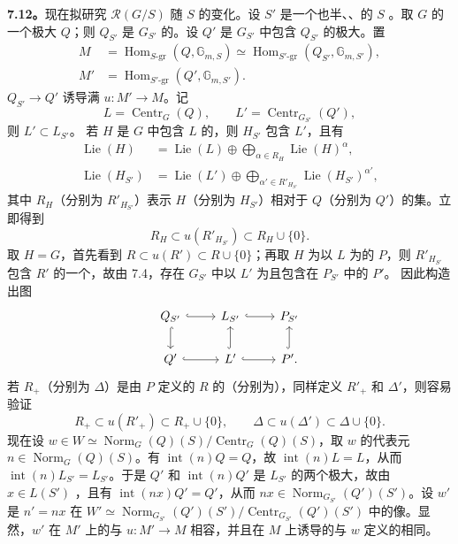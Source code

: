\textbf{7.12。}现在拟研究 $\mathscr R(G/S)$ 随 $S$ 的变化。设 $S'$ 是一个也半、、的 $S$ 。取 $G$ 的一个极大 $Q$；则 $Q_{S'}$ 是 $G_{S'}$ 的。设 $Q'$ 是 $G_{S'}$ 中包含 $Q_{S'}$ 的极大。置
\begin{align*}
 M&=\operatorname{Hom}_{S\text{-gr}}(Q,\mathbb G_{m,S})\simeq\operatorname{Hom}_{S'\text{-gr}}(Q_{S'},\mathbb G_{m,S'}),\\
 M'&=\operatorname{Hom}_{S'\text{-gr}}(Q',\mathbb G_{m,S'}).
\end{align*}
 $Q_{S'}\to Q'$ 诱导满 $u:M'\to M$。记
\[
 L=\operatorname{Centr}_G(Q),\qquad L'=\operatorname{Centr}_{G_{S'}}(Q'),
\]
则 $L'\subset L_{S'}$。
若 $H$ 是 $G$ 中包含 $L$ 的，则 $H_{S'}$ 包含 $L'$，且有
\begin{align*}
 \operatorname{Lie}(H)&=\operatorname{Lie}(L)\oplus\bigoplus_{\alpha\in R_H}\operatorname{Lie}(H)^\alpha,\\
 \operatorname{Lie}(H_{S'})&=\operatorname{Lie}(L')\oplus\bigoplus_{\alpha'\in R'_{H_{S'}}}\operatorname{Lie}(H_{S'})^{\alpha'},
\end{align*}
其中 $R_H$（分别为 $R'_{H_{S'}}$）表示 $H$（分别为 $H_{S'}$）相对于 $Q$（分别为 $Q'$）的集。立即得到
\[
 R_H\subset u(R'_{H_{S'}})\subset R_H\cup\{0\}.
\]
取 $H=G$，首先看到 $R\subset u(R')\subset R\cup\{0\}$；再取 $H$ 为以 $L$ 为的 $P$，则 $R'_{H_{S'}}$ 包含 $R'$ 的一个，故由 7.4，存在 $G_{S'}$ 中以 $L'$ 为且包含在 $P_{S'}$ 中的 $P'$。
因此构造出图
\[
\begin{tikzcd}
 Q_{S'}\arrow[r,hook]\arrow[d,hook]&L_{S'}\arrow[r,hook]&P_{S'}\\
 Q'\arrow[r,hook]&L'\arrow[u,hook]\arrow[r,hook]&P'\arrow[u,hook].
\end{tikzcd}
\]
若 $R_+$（分别为 $\Delta$）是由 $P$ 定义的 $R$ 的（分别为），同样定义 $R'_+$ 和 $\Delta'$，则容易验证
\[
 R_+\subset u(R'_+)\subset R_+\cup\{0\},\qquad
 \Delta\subset u(\Delta')\subset\Delta\cup\{0\}.
\]
现在设 $w\in W\simeq\operatorname{Norm}_G(Q)(S)/\operatorname{Centr}_G(Q)(S)$，取 $w$ 的代表元 $n\in\operatorname{Norm}_G(Q)(S)$。有 $\operatorname{int}(n)Q=Q$，故 $\operatorname{int}(n)L=L$，从而 $\operatorname{int}(n)L_{S'}=L_{S'}$。于是 $Q'$ 和 $\operatorname{int}(n)Q'$ 是 $L_{S'}$ 的两个极大，故由 $x\in L(S')$ ，且有 $\operatorname{int}(nx)Q'=Q'$，从而 $nx\in\operatorname{Norm}_{G_{S'}}(Q')(S')$。设 $w'$ 是 $n'=nx$ 在 $W'\simeq\operatorname{Norm}_{G_{S'}}(Q')(S')/\operatorname{Centr}_{G_{S'}}(Q')(S')$ 中的像。显然，$w'$ 在 $M'$ 上的与 $u:M'\to M$ 相容，并且在 $M$ 上诱导的与 $w$ 定义的相同。
